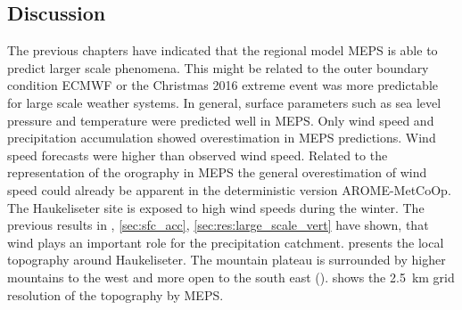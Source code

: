 \subsection{Discussion}\label{sec:res:oro_infl}
The previous chapters have indicated that the regional model MEPS is able to predict larger scale phenomena. This might be related to the outer boundary condition ECMWF or the Christmas 2016 extreme event was more predictable for large scale weather systems. In general, surface parameters such as sea level pressure and temperature were predicted well in MEPS. Only wind speed and precipitation accumulation showed overestimation in MEPS predictions. Wind speed forecasts were higher than observed wind speed. Related to the representation of the orography in MEPS the general overestimation of wind speed could already be apparent in the deterministic version AROME-MetCoOp.
\\
The Haukeliseter site is exposed to high wind speeds during the winter. The previous results in , \ref{sec:sfc_acc}, \ref{sec:res:large_scale_vert} have shown, that wind plays an important role for the precipitation catchment.  presents the local topography around Haukeliseter.
The mountain plateau is surrounded by higher mountains to the west and more open to the south east ().  shows the \SI{2.5}{\km} grid resolution of the topography by MEPS. 
